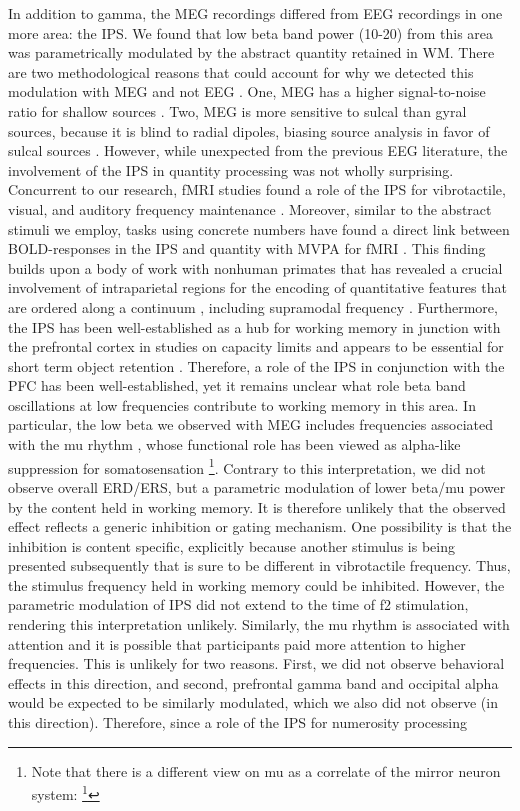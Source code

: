 In addition to gamma, the MEG recordings differed from EEG recordings in one more area: the IPS. We found that low beta band power (10-20) from this area was parametrically modulated by the abstract quantity retained in WM. There are two methodological reasons that could account for why we detected this modulation with MEG and not EEG \parencite[cf.][]{Spitzer2014}. One, MEG has a higher signal-to-noise ratio for shallow sources \parencite{Goldenholz2009}. Two, MEG is more sensitive to sulcal than gyral sources, because it is blind to radial dipoles, biasing source analysis in favor of sulcal sources \parencite{Ahlfors2010}. However, while unexpected from the previous EEG literature, the involvement of the IPS in quantity processing was not wholly surprising. Concurrent to our research, fMRI studies found a role of the IPS for vibrotactile, visual, and auditory frequency maintenance \parencite{Uluc2018,Wu2018}. Moreover, similar to the abstract stimuli we employ, tasks using concrete numbers have found a direct link between BOLD-responses in the IPS and quantity with MVPA for fMRI \parencite{Eger2009}. This finding builds upon a body of work with nonhuman primates that has revealed a crucial involvement of intraparietal regions for the encoding of quantitative features that are ordered along a continuum \parencite{Jacob2012,Nieder2016}, including supramodal frequency \parencite{Vergara2016}. Furthermore, the IPS has been well-established as a hub for working memory in junction with the prefrontal cortex in studies on capacity limits and appears to be essential for short term object retention \parencite{Todd2004,Todd2005,Vogel2004,Xu2006}. Therefore, a role of the IPS in conjunction with the PFC has been well-established, yet it remains unclear what role beta band oscillations at low frequencies contribute to working memory in this area. In particular, the low beta we observed with MEG includes frequencies associated with the mu rhythm \parencite{Chatrian1959,Gastaut1954}, whose functional role has been viewed as alpha-like suppression for somatosensation \footnote{Note that there is a different view on mu as a correlate of the mirror neuron system: \footcite{Naeem2012,Pineda2005}}. Contrary to this interpretation, we did not observe overall ERD/ERS, but a parametric modulation of lower beta/mu power by the content held in working memory. It is therefore unlikely that the observed effect reflects a generic inhibition or gating mechanism. One possibility is that the inhibition is content specific, explicitly because another stimulus is being presented subsequently that is sure to be different in vibrotactile frequency. Thus, the stimulus frequency held in working memory could be inhibited. However, the parametric modulation of IPS did not extend to the time of f2 stimulation, rendering this interpretation unlikely. Similarly, the mu rhythm is associated with attention \parencite{Anderson2011} and it is possible that participants paid more attention to higher frequencies. This is unlikely for two reasons. First, we did not observe behavioral effects in this direction, and second, prefrontal gamma band and occipital alpha would be expected to be similarly modulated, which we also did not observe (in this direction). Therefore, since a role of the IPS for numerosity processing 